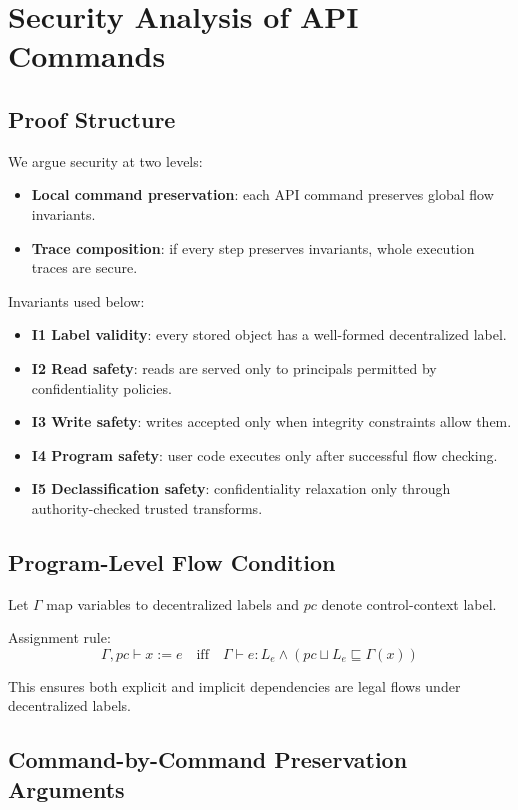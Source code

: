 \section{Security Analysis of API Commands}

\subsection{Proof Structure}

We argue security at two levels:
\begin{itemize}
    \item \textbf{Local command preservation}: each API command preserves global flow invariants.
    \item \textbf{Trace composition}: if every step preserves invariants, whole execution traces are secure.
\end{itemize}

Invariants used below:
\begin{itemize}
    \item \textbf{I1 Label validity}: every stored object has a well-formed decentralized label.
    \item \textbf{I2 Read safety}: reads are served only to principals permitted by confidentiality policies.
    \item \textbf{I3 Write safety}: writes accepted only when integrity constraints allow them.
    \item \textbf{I4 Program safety}: user code executes only after successful flow checking.
    \item \textbf{I5 Declassification safety}: confidentiality relaxation only through authority-checked trusted transforms.
\end{itemize}

\subsection{Program-Level Flow Condition}

Let $\Gamma$ map variables to decentralized labels and $pc$ denote control-context label.

Assignment rule:
\[
\Gamma,pc \vdash x := e \quad \text{iff} \quad \Gamma \vdash e:L_e \land (pc \sqcup L_e \sqsubseteq \Gamma(x))
\]

This ensures both explicit and implicit dependencies are legal flows under decentralized labels.

\subsection{Command-by-Command Preservation Arguments}

